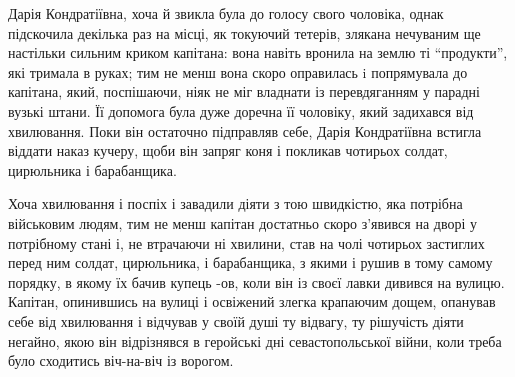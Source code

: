 \documentclass[a4paper,20pt]{report}
\begin{document}
Дарія Кондратіївна, хоча й звикла була до голосу свого чоловіка, однак
підскочила декілька раз на місці, як токуючий тетерів, злякана нечуваним ще
настільки сильним криком капітана: вона навіть вронила на землю ті
``продукти'', які тримала в руках; тим не менш вона скоро оправилась i
попрямувала до капітана, який, поспішаючи, ніяк не міг владнати із
перевдяганням у парадні вузькі штани. Її допомога була дуже доречна її
чоловіку, який задихався від хвилювання. Поки він остаточно підправляв себе,
Дарія Кондратіївна встигла віддати наказ кучеру, щоби він запряг коня і
покликав чотирьох солдат, цирюльника і барабанщика.

Хоча хвилювання і поспіх і завадили діяти з тою швидкістю, яка 
потрібна військовим людям, тим не менш
капітан достатньо скоро з'явився на дворі у потрібному стані і, не втрачаючи ні
хвилини, став на чолі чотирьох застиглих перед ним солдат, цирюльника, і
барабанщика, з якими і рушив в тому самому порядку, в якому їх бачив купець
-ов, коли він із своєї лавки дивився на вулицю. Капітан, опинившись на вулиці і
освіжений злегка крапаючим дощем, опанував себе від хвилювання і відчував у
своїй душі ту відвагу, ту рішучість діяти негайно, якою він відрізнявся в
геройські дні севастопольської війни, коли треба було сходитись віч-на-віч із
ворогом.


	



\end{document}
